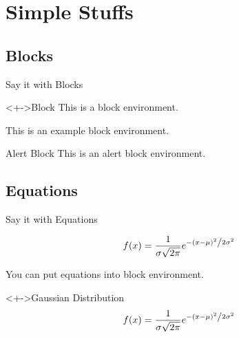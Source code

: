 \documentclass{beamer}
\begin{document}
\section{Simple Stuffs}

\subsection{Blocks}

\begin{frame}{Say it with Blocks}

\begin{block}<+->{Block} 
This is a block environment.
\end{block}

\begin{example}
This is an example block environment.
\end{example}

 \begin{alertblock}{Alert Block}
This is an alert block environment.
\end{alertblock}

\end{frame}

\subsection{Equations}

\begin{frame}{Say it with Equations}

\begin{equation}
f(x) = \frac{1}{{\sigma \sqrt {2\pi } }}e^{{{ - \left( {x - \mu } \right)^2 } \mathord{\left/ {\vphantom {{ - \left( {x - \mu } \right)^2 } {2\sigma ^2 }}} \right. \kern-\nulldelimiterspace} {2\sigma ^2 }}}
\end{equation}

  \vspace*{.5cm}
You can put equations into block environment.
  \vspace*{.5cm}

\begin{block}<+->{Gaussian Distribution}
\begin{equation}
f(x) = \frac{1}{{\sigma \sqrt {2\pi } }}e^{{{ - \left( {x - \mu } \right)^2 } \mathord{\left/ {\vphantom {{ - \left( {x - \mu } \right)^2 } {2\sigma ^2 }}} \right. \kern-\nulldelimiterspace} {2\sigma ^2 }}}	
\end{equation}
\end{block}

\end{frame}
\end{document}
